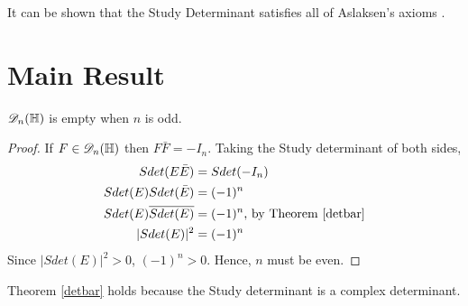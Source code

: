 
It can be shown that the Study Determinant satisfies all of Aslaksen's axioms \cite{aslaksen}.

\section{Main Result}
\begin{prop}
 $_n(\HH)$ is empty when $n$ is odd.
\end{prop}
\begin{proof}
	If $F \in {}_{n}(\HH)$ then $F\bar{F} = -I_n$. \newline Taking the Study determinant of both sides, 
	\begin{align*}
		Sdet(E\bar{E}) &= Sdet(-I_n) \\
		Sdet(E)Sdet(\bar{E}) &= (-1)^n \\
		Sdet(E)\overline{Sdet(E)} &= (-1)^n \text{, by Theorem \ref{detbar}} \\
		|Sdet(E)|^2 &= (-1)^n
	\end{align*}
	Since $|Sdet(E)|^2 > 0$, $(-1)^n > 0$. Hence, $n$ must be even.
\end{proof}
\begin{remark}
	Theorem \ref{detbar} holds because the Study determinant is a complex determinant.
\end{remark}